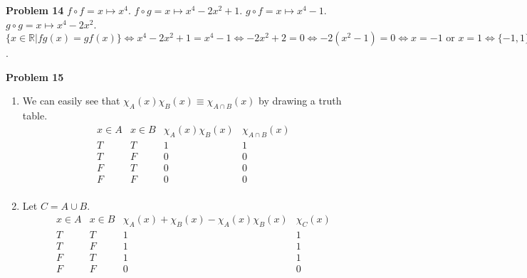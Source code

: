 \documentclass{article}
\begin{document}
\textbf{Problem 14}
$f\circ f = x \mapsto x^4$. $f\circ g = x \mapsto x^4 -2x^2 + 1$. $g\circ f=x \mapsto x^4-1$. $g\circ g = x \mapsto x^4-2x^2$. \\
$\{x \in \mathbb{R}|fg(x)=gf(x)\} \Leftrightarrow x^4-2x^2+1=x^4-1 \Leftrightarrow -2x^2+2=0 \Leftrightarrow-2(x^2-1)=0\Leftrightarrow x=-1\text{ or }x=1 \Leftrightarrow \{-1,1\}$.
\bigbreak

\textbf{Problem 15}
\begin{enumerate}[label={(\roman*)}]
    \item 
    We can easily see that $\chi_A(x)\chi_B(x) \equiv \chi_{A\cap B}(x)$ by drawing a truth table.
    \begin{displaymath}
        \begin{array}{|c|c|c|c|}
        x\in A & x\in B & \chi_A(x)\chi_B(x) & \chi_{A\cap B}(x)\\ 
        \hline  
        T & T & 1 & 1 \\
        T & F & 0 & 0 \\
        F & T & 0 & 0 \\
        F & F & 0 & 0 \\
        \end{array}
    \end{displaymath}

    \item 
    Let $C = A \cup B$.
    \begin{displaymath}
        \begin{array}{|c|c|c|c|}
        x\in A & x\in B & \chi_A(x)+\chi_B(x)-\chi_A(x)\chi_B(x) & \chi_C(x)\\ 
        \hline  
        T & T & 1 & 1 \\
        T & F & 1 & 1 \\
        F & T & 1 & 1 \\
        F & F & 0 & 0 \\
        \end{array}
    \end{displaymath}
\end{enumerate}
\bigbreak
\end{document}
